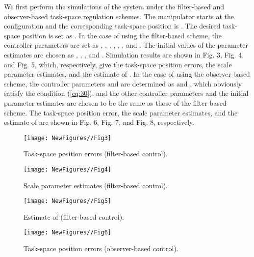 \documentclass[9pt,technote]{IEEEtran}
\begin{document}
{We first perform the simulations of the system under the filter-based and observer-based task-space regulation schemes. The manipulator starts at the configuration  and the corresponding task-space position is . The desired task-space position is set as . In the case of using the filter-based scheme, the controller parameters are set as , , , , , , and . The initial values of the parameter estimates are chosen as , , , and . Simulation results are shown in Fig. 3, Fig. 4, and Fig. 5, which, respectively, give the task-space position errors, the scale parameter estimates, and the estimate of . In the case of using the observer-based scheme, the controller parameters  and  are determined as  and , which obviously satisfy the condition (\ref{eq:30}), and the other controller parameters and the initial parameter estimates are chosen to be the same as those of the filter-based scheme. The task-space position error, the scale parameter estimates, and the estimate of  are shown in Fig. 6, Fig. 7, and Fig. 8, respectively.


\begin{figure}
\centering
\begin{minipage}[t]{1.0\linewidth}
\centering
\texttt{[image: NewFigures//Fig3]}
\caption{Task-space position errors (filter-based control).}\label{fig:side:a}
\end{minipage}\end{figure}

\begin{figure}
\centering
\begin{minipage}[t]{1.0\linewidth}
\centering
\texttt{[image: NewFigures//Fig4]}
\caption{Scale parameter estimates (filter-based control).}\label{fig:side:a}
\end{minipage}\end{figure}

\begin{figure}
\centering
\begin{minipage}[t]{1.0\linewidth}
\centering
\texttt{[image: NewFigures//Fig5]}
\caption{Estimate of  (filter-based control).}\label{fig:side:a}
\end{minipage}\end{figure}


\begin{figure}
\centering
\begin{minipage}[t]{1.0\linewidth}
\centering
\texttt{[image: NewFigures//Fig6]}
\caption{Task-space position errors (observer-based control).}\label{fig:side:a}
\end{minipage}\end{figure}

}
\end{document}
